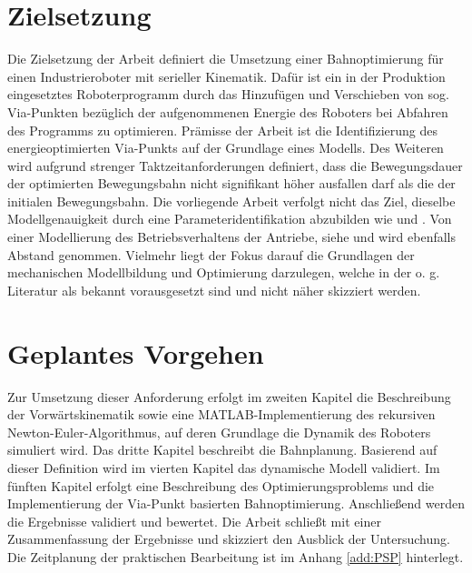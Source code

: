 \section{Zielsetzung}
Die Zielsetzung der Arbeit definiert die Umsetzung einer Bahnoptimierung für einen Industrieroboter mit serieller Kinematik. Dafür ist ein in der Produktion eingesetztes Roboterprogramm durch das Hinzufügen und Verschieben von sog. Via-Punkten bezüglich
der aufgenommenen Energie des Roboters bei Abfahren des Programms zu optimieren. Prämisse der Arbeit ist die Identifizierung des energieoptimierten Via-Punkts auf der Grundlage eines Modells. Des Weiteren wird aufgrund strenger Taktzeitanforderungen definiert, dass die Bewegungsdauer der optimierten Bewegungsbahn nicht signifikant höher ausfallen darf als die der initialen Bewegungsbahn. Die vorliegende Arbeit verfolgt nicht das Ziel, dieselbe Modellgenauigkeit durch eine Parameteridentifikation abzubilden wie \cite{Pellicciari.2011} und \cite{Gattringer.2013}. Von einer Modellierung des Betriebsverhaltens der Antriebe, siehe \cite{Eggers.2019} und \cite{Ziaukas.2017} wird ebenfalls Abstand genommen. Vielmehr liegt der Fokus darauf die Grundlagen der mechanischen Modellbildung und Optimierung darzulegen, welche in der o. g. Literatur als bekannt vorausgesetzt sind und nicht näher skizziert werden. 	
\section{Geplantes Vorgehen}
Zur Umsetzung dieser Anforderung erfolgt im zweiten Kapitel die Beschreibung der Vorwärtskinematik sowie eine MATLAB\textsuperscript{\textregistered}-Implementierung des rekursiven Newton-Euler-Algorithmus, auf deren Grundlage die Dynamik des Roboters simuliert wird. Das dritte Kapitel beschreibt die Bahnplanung.  Basierend auf dieser Definition wird im vierten Kapitel das dynamische Modell validiert. Im fünften Kapitel erfolgt eine Beschreibung des Optimierungsproblems und die Implementierung der Via-Punkt basierten Bahnoptimierung. Anschließend werden die Ergebnisse validiert und bewertet. Die Arbeit schließt mit einer Zusammenfassung der Ergebnisse und skizziert den Ausblick der Untersuchung. 
Die Zeitplanung der praktischen Bearbeitung ist im Anhang \ref{add:PSP} hinterlegt.